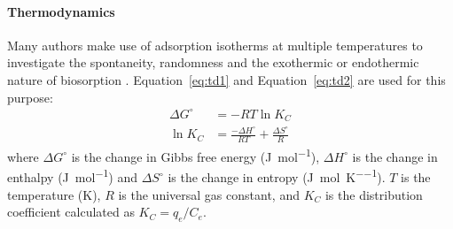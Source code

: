 \paragraph{Thermodynamics} Many authors make use of adsorption isotherms at multiple temperatures to investigate the spontaneity, randomness and the exothermic or endothermic nature of biosorption \parencite{Rangabhashiyam2019}. Equation~\ref{eq:td1} and Equation~\ref{eq:td2} are used for this purpose:
\begin{align}
\Delta G^\circ &= -RT \ln K_C \label{eq:td1}\\
\ln K_C &= \frac{-\Delta H^\circ}{RT} + \frac{\Delta S^\circ}{R} \label{eq:td2}
\end{align}
where $ \Delta G^\circ $ is the change in Gibbs free energy  (\si{\joule\per\mole}), $ \Delta H^\circ $ is the change in enthalpy  (\si{\joule\per\mole}) and $ \Delta S^\circ $ is the change in entropy (\si{\joule\per\mole\per\kelvin}). $ T $ is the temperature (\si{K}), $ R $ is the universal gas constant, and $ K_C $ is the distribution coefficient calculated as $ K_C = q_e/C_e $.


